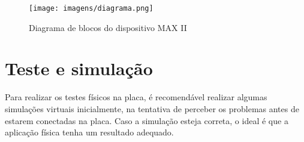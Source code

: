 \begin{figure}[!htb]
  \centering
    \texttt{[image: imagens/diagrama.png]}
  \caption{Diagrama de blocos do dispositivo MAX II}
  \label{fig:diagramadeblocos}
\end{figure}

\section{Teste e simulação}

Para realizar os testes físicos na placa, é recomendável realizar algumas simulações virtuais inicialmente, na tentativa de perceber os problemas antes de estarem conectadas na placa. Caso a simulação esteja correta, o ideal é que a aplicação física tenha um resultado adequado. 



